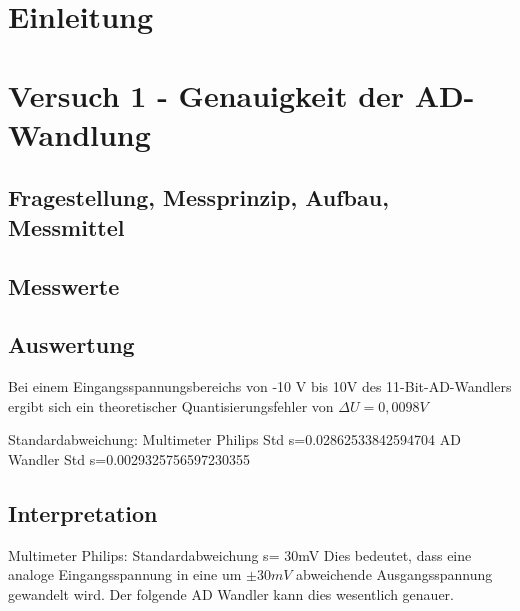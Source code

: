 \documentclass[12pt,oneside,a4paper]{report}
\begin{document}




\clearpage

%
%


%
%


%
%


%
%




\setcounter{page}{1}
%
%
\chapter{Einleitung}
\label{chap:EINL}


%
%
\chapter{Versuch 1 - Genauigkeit der AD-Wandlung}
\label{chap:VERSUCH_1}

\section{Fragestellung, Messprinzip, Aufbau, Messmittel}
\label{chap:VERSUCH_1_FRAGESTELLUNG}

\section{Messwerte}
\label{chap:VERSUCH_1_MESSWERTE}



\section{Auswertung}
\label{chap:VERSUCH_1_AUSWERTUNG}
Bei einem Eingangsspannungsbereichs von -10 V bis 10V des 11-Bit-AD-Wandlers ergibt sich ein theoretischer Quantisierungsfehler von $\Delta U = 0,0098 V$

Standardabweichung:
Multimeter Philips Std s=0.02862533842594704
AD Wandler Std s=0.0029325756597230355

\section{Interpretation}
\label{chap:VERSUCH_1_INTERPRETATION}
Multimeter Philips:
Standardabweichung s= 30mV
Dies bedeutet, dass eine analoge Eingangsspannung in eine um $\pm30mV$ abweichende Ausgangsspannung gewandelt wird. Der folgende AD Wandler kann dies wesentlich genauer.
\end{document}
